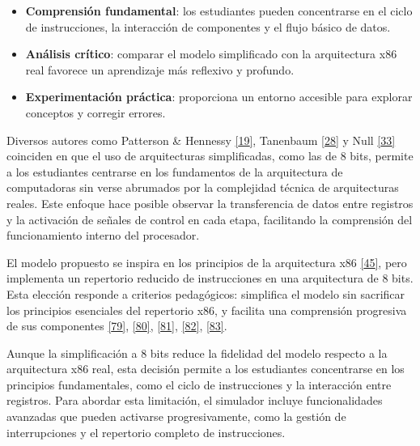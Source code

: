 \documentclass[12pt,oneside]{templates/unerthesis}
\providecommand{\tightlist}{%
  \setlength{\itemsep}{0pt}\setlength{\parskip}{0pt}}
\begin{document}
\begin{itemize}
\tightlist
\item
  \textbf{Comprensión fundamental}: los estudiantes pueden concentrarse en el ciclo de instrucciones, la interacción de componentes y el flujo básico de datos.\\
\item
  \textbf{Análisis crítico}: comparar el modelo simplificado con la arquitectura x86 real favorece un aprendizaje más reflexivo y profundo.\\
\item
  \textbf{Experimentación práctica}: proporciona un entorno accesible para explorar conceptos y corregir errores.
\end{itemize}

Diversos autores como Patterson \& Hennessy \protect\hyperlink{ref-hennessy2017computer}{{[}19{]}}, Tanenbaum \protect\hyperlink{ref-tanenbaum_structured_2016}{{[}28{]}} y Null \protect\hyperlink{ref-null_essentials_2023}{{[}33{]}} coinciden en que el uso de arquitecturas simplificadas, como las de 8 bits, permite a los estudiantes centrarse en los fundamentos de la arquitectura de computadoras sin verse abrumados por la complejidad técnica de arquitecturas reales. Este enfoque hace posible observar la transferencia de datos entre registros y la activación de señales de control en cada etapa, facilitando la comprensión del funcionamiento interno del procesador.

El modelo propuesto se inspira en los principios de la arquitectura x86 \protect\hyperlink{ref-intel_microarchitecture_2021}{{[}45{]}}, pero implementa un repertorio reducido de instrucciones en una arquitectura de 8 bits. Esta elección responde a criterios pedagógicos: simplifica el modelo sin sacrificar los principios esenciales del repertorio x86, y facilita una comprensión progresiva de sus componentes \protect\hyperlink{ref-patt2019introduction}{{[}79{]}}, \protect\hyperlink{ref-majid1999design}{{[}80{]}}, \protect\hyperlink{ref-morlan_sap1_2021}{{[}81{]}}, \protect\hyperlink{ref-Guald_2015_thesis}{{[}82{]}}, \protect\hyperlink{ref-silber_tinycpu}{{[}83{]}}.

Aunque la simplificación a 8 bits reduce la fidelidad del modelo respecto a la arquitectura x86 real, esta decisión permite a los estudiantes concentrarse en los principios fundamentales, como el ciclo de instrucciones y la interacción entre registros. Para abordar esta limitación, el simulador incluye funcionalidades avanzadas que pueden activarse progresivamente, como la gestión de interrupciones y el repertorio completo de instrucciones.
\end{document}
